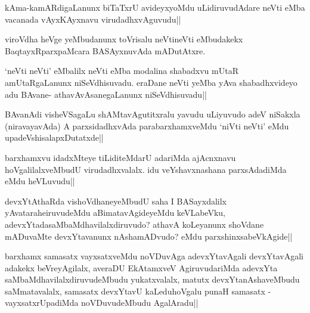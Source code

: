 
\begin{artha}
kAma-kamARdigaLanunx biTaTxrU avideyxyoMdu uLidiruvudAdare neVti eMba vacanada vAyxKAyxnavu virudadhxvAguvudu||
\end{artha}

\begin{artha}
viroVdha heVge yeMbudanunx toVrisalu neVtineVti eMbudakekx BaqtayxRparxpaMcara BASAyxnuvAda mADutAtxre.
\end{artha}

\begin{artha}
`neVti neVti' eMbalilx neVti eMba modalina shabadxvu mUtaR amUtaRgaLanunx niSeVdhisuvadu. eraDane neVti yeMba yAva shabadhxvideyo adu BAvane- athavAvAsanegaLanunx niSeVdhisuvadu||
\end{artha}


\begin{artha}
BAvanAdi visheVSagaLu shAMtavAgutitxralu yavudu uLiyuvudo adeV niSakxla (niravayavAda) A parxsidadhxvAda parabarxhamxveMdu `niVti neVti' eMdu upadeVshisalapxDutatxde||
\end{artha}

\begin{artha}
barxhamxvu idadxMteye tiLiditeMdarU adariMda ajAcnxnavu hoVgalilalxveMbudU virudadhxvalalx. idu veYshavxnashana parxsAdadiMda eMdu heVLuvudu||
\end{artha}


\begin{artha}
devxYtAthaRda vishoVdhaneyeMbudU saha I BASayxdalilx yAvataraheiruvudeMdu aBimatavAgideyeMdu keVLabeVku, adevxYtadasaMbaMdhavilalxdiruvudo? athavA koLeyanunx shoVdane mADuvaMte devxYtavanunx nAshamADvudo? eMdu parxshinxsabeVkAgide||
\end{artha}


\begin{artha}
barxhamx samasatx vayxsatxveMdu noVDuvAga adevxYtavAgali devxYtavAgali adakekx beVreyAgilalx, averaDU EkAtamxveV AgiruvudariMda adevxYta saMbaMdhavilalxdiruvudeMbudu yukatxvalalx, matutx devxYtanAshaveMbudu saMmatavalalx, samasatx devxYtavU kaLeduhoVgalu punaH samasatx - vayxsatxrUpadiMda noVDuvudeMbudu AgalAradu||
\end{artha}

